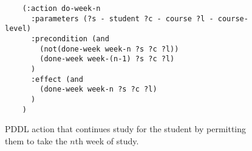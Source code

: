 \begin{figure}[t]
    \begin{lstlisting}
    (:action do-week-n
      :parameters (?s - student ?c - course ?l - course-level)
      :precondition (and 
        (not(done-week week-n ?s ?c ?l))
        (done-week week-(n-1) ?s ?c ?l)
      )
      :effect (and 
        (done-week week-n ?s ?c ?l)
      )
    )
    \end{lstlisting}
    \caption{PDDL action that continues study for the student by permitting them to take the $n$th week of study.}\label{fig:do-week-n}
\end{figure}
    